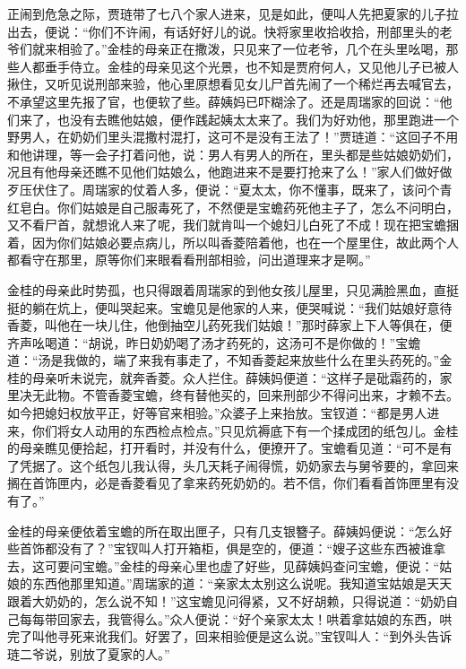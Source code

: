 \begin{parag}
    正闹到危急之际，贾琏带了七八个家人进来，见是如此，便叫人先把夏家的儿子拉出去，便说：“你们不许闹，有话好好儿的说。快将家里收拾收拾，刑部里头的老爷们就来相验了。”金桂的母亲正在撒泼，只见来了一位老爷，几个在头里吆喝，那些人都垂手侍立。金桂的母亲见这个光景，也不知是贾府何人，又见他儿子已被人揪住，又听见说刑部来验，他心里原想看见女儿尸首先闹了一个稀烂再去喊官去，不承望这里先报了官，也便软了些。薛姨妈已吓糊涂了。还是周瑞家的回说：“他们来了，也没有去瞧他姑娘，便作践起姨太太来了。我们为好劝他，那里跑进一个野男人，在奶奶们里头混撒村混打，这可不是没有王法了！”贾琏道：“这回子不用和他讲理，等一会子打着问他，说：男人有男人的所在，里头都是些姑娘奶奶们，况且有他母亲还瞧不见他们姑娘么，他跑进来不是要打抢来了么！”家人们做好做歹压伏住了。周瑞家的仗着人多，便说：“夏太太，你不懂事，既来了，该问个青红皂白。你们姑娘是自己服毒死了，不然便是宝蟾药死他主子了，怎么不问明白，又不看尸首，就想讹人来了呢，我们就肯叫一个媳妇儿白死了不成！现在把宝蟾捆着，因为你们姑娘必要点病儿，所以叫香菱陪着他，也在一个屋里住，故此两个人都看守在那里，原等你们来眼看看刑部相验，问出道理来才是啊。”
\end{parag}


\begin{parag}
    金桂的母亲此时势孤，也只得跟着周瑞家的到他女孩儿屋里，只见满脸黑血，直挺挺的躺在炕上，便叫哭起来。宝蟾见是他家的人来，便哭喊说：“我们姑娘好意待香菱，叫他在一块儿住，他倒抽空儿药死我们姑娘！”那时薛家上下人等俱在，便齐声吆喝道：“胡说，昨日奶奶喝了汤才药死的，这汤可不是你做的！”宝蟾道：“汤是我做的，端了来我有事走了，不知香菱起来放些什么在里头药死的。”金桂的母亲听未说完，就奔香菱。众人拦住。薛姨妈便道：“这样子是砒霜药的，家里决无此物。不管香菱宝蟾，终有替他买的，回来刑部少不得问出来，才赖不去。如今把媳妇权放平正，好等官来相验。”众婆子上来抬放。宝钗道：“都是男人进来，你们将女人动用的东西检点检点。”只见炕褥底下有一个揉成团的纸包儿。金桂的母亲瞧见便拾起，打开看时，并没有什么，便撩开了。宝蟾看见道：“可不是有了凭据了。这个纸包儿我认得，头几天耗子闹得慌，奶奶家去与舅爷要的，拿回来搁在首饰匣内，必是香菱看见了拿来药死奶奶的。若不信，你们看看首饰匣里有没有了。”
\end{parag}


\begin{parag}
    金桂的母亲便依着宝蟾的所在取出匣子，只有几支银簪子。薛姨妈便说：“怎么好些首饰都没有了？”宝钗叫人打开箱柜，俱是空的，便道：“嫂子这些东西被谁拿去，这可要问宝蟾。”金桂的母亲心里也虚了好些，见薛姨妈查问宝蟾，便说：“姑娘的东西他那里知道。”周瑞家的道：“亲家太太别这么说呢。我知道宝姑娘是天天跟着大奶奶的，怎么说不知！”这宝蟾见问得紧，又不好胡赖，只得说道：“奶奶自己每每带回家去，我管得么。”众人便说：“好个亲家太太！哄着拿姑娘的东西，哄完了叫他寻死来讹我们。好罢了，回来相验便是这么说。”宝钗叫人：“到外头告诉琏二爷说，别放了夏家的人。”
\end{parag}


